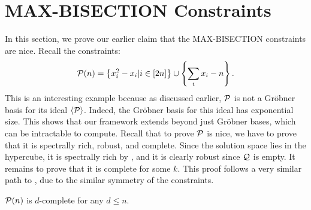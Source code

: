 \section{MAX-BISECTION Constraints}\label{sec:balance}
In this section, we prove our earlier claim that the MAX-BISECTION constraints are nice. Recall the constraints:
\[\mathcal P(n) = \left\{x_i^2 - x_i | i \in [2n]\right\} \cup \left\{\sum_i x_i - n\right\}.\]
This is an interesting example because as discussed earlier, $\mathcal P$ is not a Gr\"obner basis for its ideal $\langle \mathcal P \rangle$. Indeed, the Gr\"obner basis for this ideal has exponential size. This shows that our framework extends beyond just Gr\"obner bases, which can be intractable to compute. Recall that to prove $\mathcal P$ is nice, we have to prove that it is spectrally rich, robust, and complete. Since the solution space lies in the hypercube, it is spectrally rich by , and it is clearly robust since $\mathcal Q$ is empty. It remains to prove that it is complete for some $k$. This proof follows a very similar path to \cite{}, due to the similar symmetry of the constraints. 
\begin{lemma}
$\mathcal P(n)$ is $d$-complete for any $d \leq n$.
\end{lemma}
